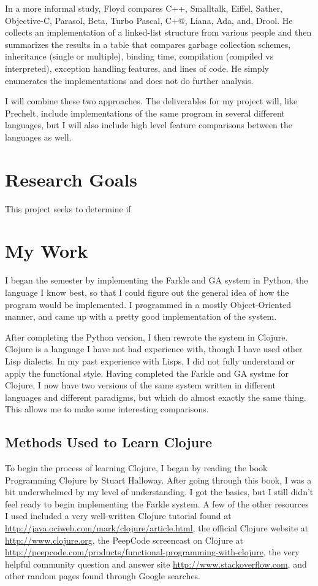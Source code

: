 \documentclass{article}
\begin{document}
In a more informal study, Floyd compares C++, Smalltalk, Eiffel, Sather,
Objective-C, Parasol, Beta, Turbo Pascal, C+@, Liana, Ada, and,
Drool\cite{DDJFloydeCompOOLangs}.  He collects an implementation of a
linked-list structure from various people and then summarizes the results in a
table that compares garbage collection schemes, inheritance (single or
multiple), binding time, compilation (compiled vs interpreted), exception
handling features, and lines of code.  He simply enumerates the implementations
and does not do further analysis.

I will combine these two approaches.  The deliverables for my project will,
like Prechelt, include implementations of the same program in several different
languages, but I will also include high level feature comparisons between the
languages as well.

\section{Research Goals}

This project seeks to determine if 

\section{My Work}

I began the semester by implementing the Farkle and GA system in Python, the language I know best, so that I could figure out the general idea of how the program would be implemented.  I programmed in a mostly Object-Oriented manner, and came up with a pretty good implementation of the system.  

After completing the Python version, I then rewrote the system in Clojure.  Clojure is a language I have not had experience with, though I have used other Lisp dialects.  In my past experience with Lisps, I did not fully understand or apply the functional style.  Having completed the Farkle and GA systme for Clojure, I now have two versions of the same system written in different languages and different paradigms, but which do almost exactly the same thing.  This allows me to make some interesting comparisons.

\subsection{Methods Used to Learn Clojure}

To begin the process of learning Clojure, I began by reading the book Programming Clojure by Stuart Halloway.  After going through this book, I was a bit underwhelmed by my level of understanding.  I got the basics, but I still didn't feel ready to begin implementing the Farkle system.  A few of the other resources I used included a very well-written Clojure tutorial found at \url{http://java.ociweb.com/mark/clojure/article.html}, the official Clojure website at \url{http://www.clojure.org}, the PeepCode screencast on Clojure at \url{http://peepcode.com/products/functional-programming-with-clojure}, the very helpful community question and answer site \url{http://www.stackoverflow.com}, and other random pages found through Google searches.
\end{document}
